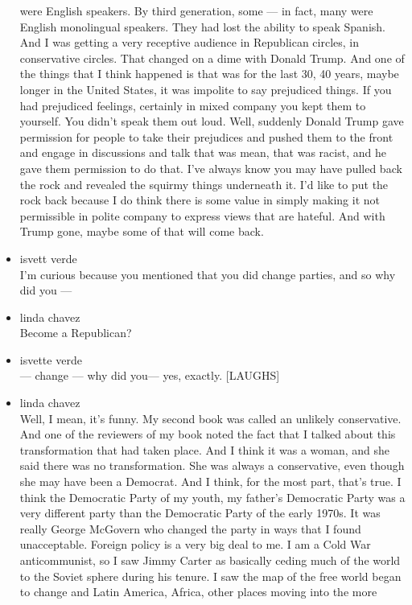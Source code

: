 \begin{itemize}
  were English speakers. By third generation, some --- in fact, many
  were English monolingual speakers. They had lost the ability to speak
  Spanish. And I was getting a very receptive audience in Republican
  circles, in conservative circles. That changed on a dime with Donald
  Trump. And one of the things that I think happened is that was for the
  last 30, 40 years, maybe longer in the United States, it was impolite
  to say prejudiced things. If you had prejudiced feelings, certainly in
  mixed company you kept them to yourself. You didn't speak them out
  loud. Well, suddenly Donald Trump gave permission for people to take
  their prejudices and pushed them to the front and engage in
  discussions and talk that was mean, that was racist, and he gave them
  permission to do that. I've always know you may have pulled back the
  rock and revealed the squirmy things underneath it. I'd like to put
  the rock back because I do think there is some value in simply making
  it not permissible in polite company to express views that are
  hateful. And with Trump gone, maybe some of that will come back.
\item
  isvett verde\\
  I'm curious because you mentioned that you did change parties, and so
  why did you ---
\item
  linda chavez\\
  Become a Republican?
\item
  isvette verde\\
  --- change --- why did you--- yes, exactly. {[}LAUGHS{]}
\item
  linda chavez\\
  Well, I mean, it's funny. My second book was called an unlikely
  conservative. And one of the reviewers of my book noted the fact that
  I talked about this transformation that had taken place. And I think
  it was a woman, and she said there was no transformation. She was
  always a conservative, even though she may have been a Democrat. And I
  think, for the most part, that's true. I think the Democratic Party of
  my youth, my father's Democratic Party was a very different party than
  the Democratic Party of the early 1970s. It was really George McGovern
  who changed the party in ways that I found unacceptable. Foreign
  policy is a very big deal to me. I am a Cold War anticommunist, so I
  saw Jimmy Carter as basically ceding much of the world to the Soviet
  sphere during his tenure. I saw the map of the free world began to
  change and Latin America, Africa, other places moving into the more

\end{itemize}
